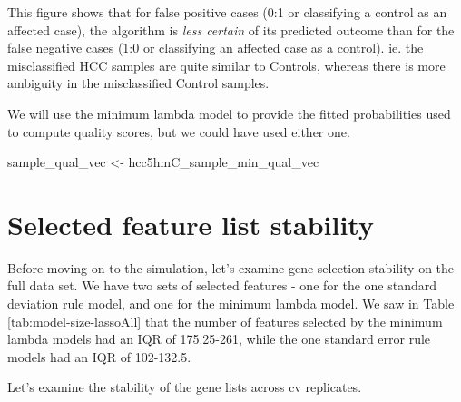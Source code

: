 \documentclass[
]{book}
\newenvironment{Shaded}{\begin{snugshade}}{\end{snugshade}}
\newcommand{\NormalTok}[1]{#1}
\newcommand{\StringTok}[1]{\textcolor[rgb]{0.31,0.60,0.02}{#1}}
\begin{document}
This figure shows that for false positive cases (0:1 or classifying a
control as an affected case), the algorithm is \emph{less certain} of its predicted
outcome than for the false negative cases (1:0 or classifying an affected case as a control).
ie. the misclassified HCC samples are quite similar to Controls, whereas there
is more ambiguity in the misclassified Control samples.

We will use the minimum lambda model to provide
the fitted probabilities used to compute quality scores,
but we could have used either one.

\begin{Shaded}
\begin{Highlighting}[]
\NormalTok{sample\_qual\_vec <{-}}\StringTok{ }\NormalTok{hcc5hmC\_sample\_min\_qual\_vec}
\end{Highlighting}
\end{Shaded}

\hypertarget{selected-feature-list-stability}{%
\section{Selected feature list stability}\label{selected-feature-list-stability}}

Before moving on to the simulation, let's examine gene selection stability on the
full data set. We have two sets of selected features - one for the
one standard deviation rule model, and one for the minimum lambda model.
We saw in Table \ref{tab:model-size-lassoAll} that the number of features
selected by the minimum lambda models had an IQR of
175.25-261,
while the one standard error rule models had an IQR of
102-132.5.

Let's examine the stability of the gene lists across cv replicates.
\end{document}
